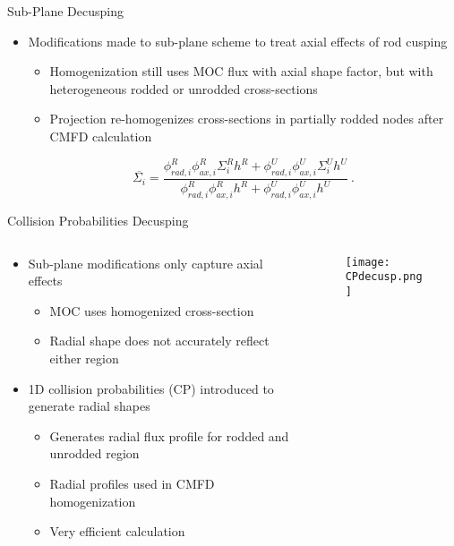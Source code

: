 \begin{frame}[t]{Sub-Plane Decusping}
    
\begin{itemize}
    \item Modifications made to sub-plane scheme to treat axial effects of rod 
    cusping
    \begin{itemize}
      \item Homogenization still uses MOC flux with axial shape factor, but 
      with heterogeneous rodded or unrodded cross-sections
      \item Projection re-homogenizes cross-sections in partially rodded nodes 
      after CMFD calculation
    \end{itemize}
    \begin{equation}\label{e:nTRACERdecusping}
    \overline{\Sigma_i} = \frac{\phi_{rad,i}^R \phi_{ax,i}^R \Sigma_i^R h^R + \phi_{rad,i}^U \phi_{ax,i}^U \Sigma_i^U h^U}{\phi_{rad,i}^R \phi_{ax,i}^R h^R + \phi_{rad,i}^U \phi_{ax,i}^U h^U}\ .
    \end{equation}
\end{itemize}
    
\end{frame}


\begin{frame}[t]{Collision Probabilities Decusping}
    
\begin{columns}
    \begin{column}{0.45\textwidth}
      \begin{itemize}
        \item Sub-plane modifications only capture axial effects
        \begin{itemize}
          \item MOC uses homogenized cross-section
          \item Radial shape does not accurately reflect either region
        \end{itemize}
        \item 1D collision probabilities (CP) introduced to generate radial 
        shapes
        \begin{itemize}
          \item Generates radial flux profile for rodded and unrodded region
          \item Radial profiles used in CMFD homogenization
          \item Very efficient calculation
        \end{itemize}
      \end{itemize}
    \end{column}
    \begin{column}{0.55\textwidth}
    \begin{figure}[h]
      \centering
      \texttt{[image: CPdecusp.png]}
    \end{figure}
\end{column}
\end{columns}
    
\end{frame}